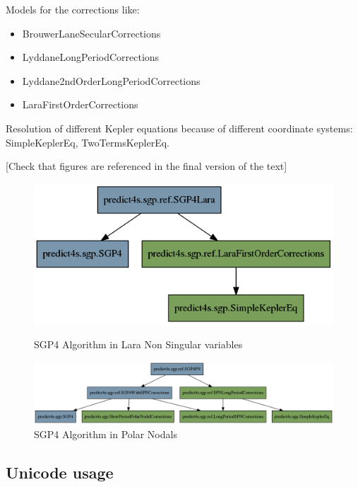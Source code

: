 \documentclass{article}
\begin{document}
Models for the corrections like:
\begin{itemize}
\item BrouwerLaneSecularCorrections
\item LyddaneLongPeriodCorrections
\item Lyddane2ndOrderLongPeriodCorrections
\item LaraFirstOrderCorrections
\end{itemize}

Resolution of different Kepler equations because of
different coordinate systems: SimpleKeplerEq, TwoTermsKeplerEq.

[{\color{red}Check that figures are referenced in the final version of the text}]

\begin{figure}[htb]
  \centering
	\includegraphics[width=\linewidth]{lara.png}
\label{fig:res}
\caption{SGP4 Algorithm in Lara Non Singular variables}
\end{figure}

\begin{figure}[htb]
  \centering
	\includegraphics[width=\linewidth]{pn.png}
\caption{SGP4 Algorithm in Polar Nodals}
\end{figure}

\subsection{Unicode usage}
\label{sec:unicodeusage}
\end{document}
